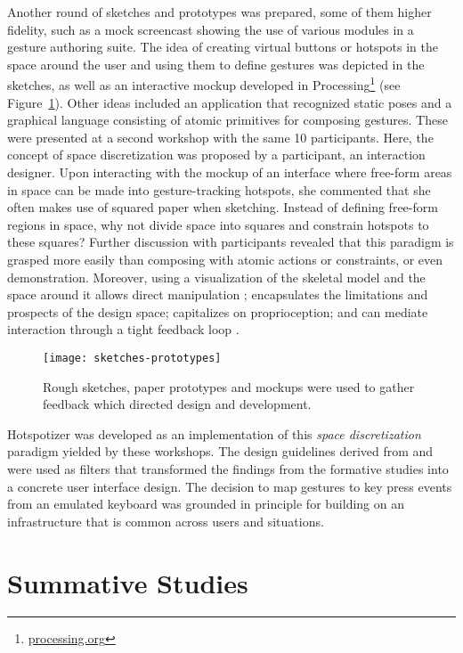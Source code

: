 Another round of sketches and prototypes was prepared, some of them higher fidelity, such as a mock screencast showing the use of various modules in a gesture authoring suite. The idea of creating virtual buttons or hotspots in the space around the user and using them to define gestures was depicted in the sketches, as well as an interactive mockup developed in Processing\footnote{\href{http://processing.org/}{processing.org}} (see Figure~\ref{fig:sketches-prototypes}). Other ideas included an application that recognized static poses and a graphical language consisting of atomic primitives for composing gestures. These were presented at a second workshop with the same 10 participants. Here, the concept of space discretization was proposed by a participant, an interaction designer. Upon interacting with the mockup of an interface where free-form areas in space can be made into gesture-tracking hotspots, she commented that she often makes use of squared paper when sketching. Instead of defining free-form regions in space, why not divide space into squares and constrain hotspots to these squares? Further discussion with participants revealed that this paradigm is grasped more easily than composing with atomic actions or constraints, or even demonstration. Moreover, using a visualization of the skeletal model and the space around it allows direct manipulation \parencite{Hutchins:1985}; encapsulates the limitations and prospects of the design space; capitalizes on proprioception; and can mediate interaction through a tight feedback loop \parencite{Wilson:2012}.

\begin{figure}[ht]
\centering
\texttt{[image: sketches-prototypes]}
\caption{Rough sketches, paper prototypes and mockups were used to gather feedback which directed design and development.}
\label{fig:sketches-prototypes}
\end{figure}

Hotspotizer was developed as an implementation of this \emph{space discretization} paradigm yielded by these workshops. The design guidelines derived from \textcite{Olsen:2007} and \textcite{Shoemaker:2010} were used as filters that transformed the findings from the formative studies into a concrete user interface design. The decision to map gestures to key press events from an emulated keyboard was grounded in  principle for building on an infrastructure that is common across users and situations.

\section{Summative Studies}
\label{sec:summative-studies}

